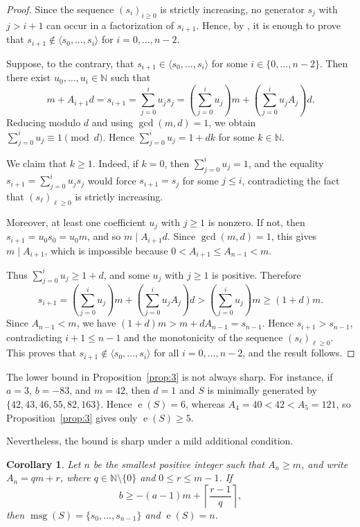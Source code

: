 \documentclass[12pt,a4paper]{amsart}
\newtheorem{corollary}[theorem]{Corollary}
\theoremstyle{definition}
\begin{document}
\begin{proof}
Since the sequence $(s_i)_{i\ge 0}$ is strictly increasing, no generator
$s_j$ with $j>i+1$ can occur in a factorization of $s_{i+1}$. Hence, by
\cite[Corollary~2.9]{libro}, it is enough to prove that
$s_{i+1}\notin\langle s_0,\ldots,s_i\rangle$ for
$i=0,\ldots,n-2$.

Suppose, to the contrary, that
$s_{i+1}\in\langle s_0,\ldots,s_i\rangle$ for some
$i\in\{0,\ldots,n-2\}$. Then there exist
$u_0,\ldots,u_i\in\mathbb{N}$ such that
\[
m+A_{i+1}d
=
s_{i+1}
=
\sum_{j=0}^i u_js_j
=
\left(\sum_{j=0}^i u_j\right)m
+
\left(\sum_{j=0}^i u_jA_j\right)d.
\]
Reducing modulo $d$ and using $\gcd(m,d)=1$, we obtain
$\sum_{j=0}^i u_j\equiv 1\pmod d$. Hence
$\sum_{j=0}^i u_j=1+dk$ for some $k\in\mathbb{N}$.

We claim that $k\ge 1$. Indeed, if $k=0$, then
$\sum_{j=0}^i u_j=1$, and the equality
$s_{i+1}=\sum_{j=0}^i u_js_j$ would force $s_{i+1}=s_j$ for some
$j\le i$, contradicting the fact that $(s_\ell)_{\ell\ge 0}$ is strictly
increasing.

Moreover, at least one coefficient $u_j$ with $j\ge 1$ is nonzero. If
not, then $s_{i+1}=u_0s_0=u_0m$, and so $m\mid A_{i+1}d$. Since
$\gcd(m,d)=1$, this gives $m\mid A_{i+1}$, which is impossible because
$0<A_{i+1}\le A_{n-1}<m$.

Thus $\sum_{j=0}^i u_j\ge 1+d$, and some $u_j$ with $j\ge 1$ is
positive. Therefore
\[
s_{i+1}
=
\left(\sum_{j=0}^i u_j\right)m
+
\left(\sum_{j=0}^i u_jA_j\right)d
>
\left(\sum_{j=0}^i u_j\right)m
\ge (1+d)m.
\]
Since $A_{n-1}<m$, we have $(1+d)m>m+dA_{n-1}=s_{n-1}$. Hence
$s_{i+1}>s_{n-1}$, contradicting $i+1\le n-1$ and the monotonicity of
the sequence $(s_\ell)_{\ell\ge 0}$. This proves that
$s_{i+1}\notin\langle s_0,\ldots,s_i\rangle$ for all
$i=0,\ldots,n-2$, and the result follows.
\end{proof}

The lower bound in Proposition~\ref{prop:3} is not always sharp. For
instance, if $a=3$, $b=-83$, and $m=42$, then $d=1$ and $S$ is minimally
generated by $\{42,43,46,55,82,163\}$. Hence $\operatorname{e}(S)=6$,
whereas $A_4=40<42<A_5=121$, so Proposition~\ref{prop:3} gives only
$\operatorname{e}(S)\ge 5$.

Nevertheless, the bound is sharp under a mild additional condition.

\begin{corollary}\label{cor:e=n}
Let $n$ be the smallest positive integer such that $A_n\ge m$, and write
$A_n=qm+r$, where $q\in\mathbb{N}\setminus\{0\}$ and
$0\le r\le m-1$. If
\[
b\ge -(a-1)m+\left\lceil\frac{r-1}{q}\right\rceil,
\]
then $\operatorname{msg}(S)=\{s_0,\ldots,s_{n-1}\}$ and
$\operatorname{e}(S)=n$.
\end{corollary}
\end{document}
